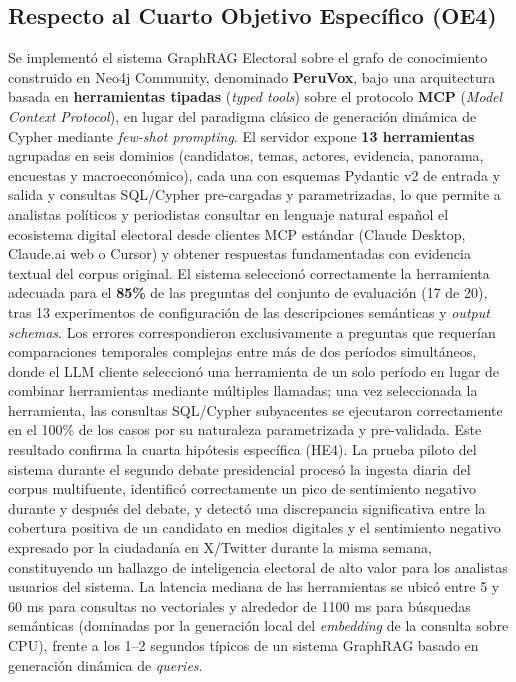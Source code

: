 \documentclass[listof=nochaptergap,12pt,times,authoryear]{report}
\begin{document}
\subsection*{Respecto al Cuarto Objetivo Específico (OE4)}
Se implementó el sistema GraphRAG Electoral sobre el grafo de conocimiento
construido en Neo4j Community, denominado \textbf{PeruVox}, bajo una arquitectura
basada en \textbf{herramientas tipadas} (\textit{typed tools}) sobre el protocolo
\textbf{MCP} (\textit{Model Context Protocol}), en lugar del paradigma clásico de
generación dinámica de Cypher mediante \textit{few-shot prompting}. El servidor
expone \textbf{13 herramientas} agrupadas en seis dominios (candidatos, temas,
actores, evidencia, panorama, encuestas y macroeconómico), cada una con esquemas
Pydantic v2 de entrada y salida y consultas SQL/Cypher pre-cargadas y
parametrizadas, lo que permite a analistas políticos y periodistas consultar en
lenguaje natural español el ecosistema digital electoral desde clientes MCP
estándar (Claude Desktop, Claude.ai web o Cursor) y obtener respuestas
fundamentadas con evidencia textual del corpus original. El sistema seleccionó
correctamente la herramienta adecuada para el \textbf{85\%} de las preguntas del
conjunto de evaluación (17 de 20), tras 13 experimentos de configuración de las
descripciones semánticas y \textit{output schemas}. Los errores correspondieron
exclusivamente a preguntas que requerían comparaciones temporales complejas entre
más de dos períodos simultáneos, donde el LLM cliente seleccionó una herramienta
de un solo período en lugar de combinar herramientas mediante múltiples llamadas;
una vez seleccionada la herramienta, las consultas SQL/Cypher subyacentes se
ejecutaron correctamente en el 100\% de los casos por su naturaleza parametrizada
y pre-validada. Este resultado confirma la cuarta hipótesis específica (HE4).
La prueba piloto del sistema durante el segundo debate presidencial procesó la
ingesta diaria del corpus multifuente, identificó correctamente un pico de
sentimiento negativo durante y después del debate, y detectó una discrepancia
significativa entre la cobertura positiva de un candidato en medios digitales y el
sentimiento negativo expresado por la ciudadanía en X/Twitter durante la misma
semana, constituyendo un hallazgo de inteligencia electoral de alto valor para los
analistas usuarios del sistema. La latencia mediana de las herramientas se ubicó
entre 5 y 60 ms para consultas no vectoriales y alrededor de 1100 ms para
búsquedas semánticas (dominadas por la generación local del \textit{embedding} de
la consulta sobre CPU), frente a los 1--2 segundos típicos de un sistema GraphRAG
basado en generación dinámica de \textit{queries}.
\end{document}
